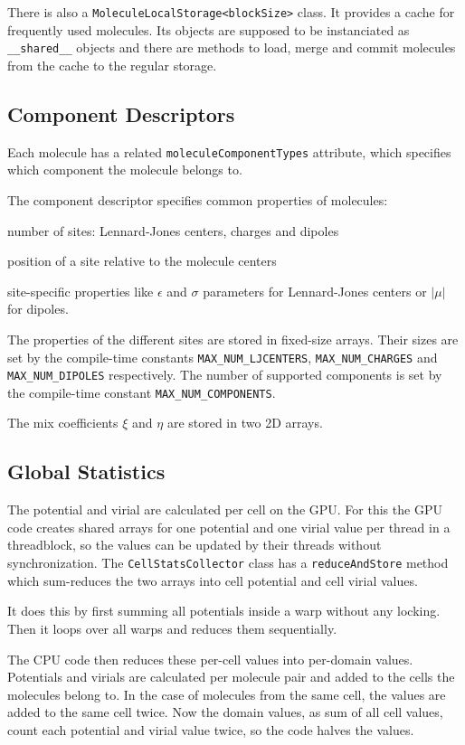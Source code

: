 There is also a \lstinline!MoleculeLocalStorage<blockSize>! class. It provides a cache for frequently used molecules. Its objects are supposed to be instanciated as \lstinline!__shared__! objects and there are methods to load, merge and commit molecules from the cache to the regular storage.

\subsection{Component Descriptors}
Each molecule has a related \lstinline!moleculeComponentTypes! attribute, which specifies which component the molecule belongs to.

The component descriptor specifies common properties of molecules:
\begin{compactitem}
\item number of sites: Lennard-Jones centers, charges and dipoles
\item position of a site relative to the molecule centers
\item site-specific properties like $\epsilon$ and $\sigma$ parameters for Lennard-Jones centers or $\left  | \mu \right | $ for dipoles.
\end{compactitem}
The properties of the different sites are stored in fixed-size arrays.
Their sizes are set by the compile-time constants \lstinline!MAX_NUM_LJCENTERS!, \lstinline!MAX_NUM_CHARGES! and \lstinline!MAX_NUM_DIPOLES! respectively.
The number of supported components is set by the compile-time constant \lstinline!MAX_NUM_COMPONENTS!.

The mix coefficients $\xi$ and $\eta$ are stored in two 2D arrays.

\subsection{Global Statistics}
The potential and virial are calculated per cell on the GPU. For this the GPU code creates shared arrays for one potential and one virial value per thread in a threadblock, so the values can be updated by their threads without synchronization. The \lstinline!CellStatsCollector! class has a \lstinline!reduceAndStore! method which sum-reduces the two arrays into cell potential and cell virial values.

It does this by first summing all potentials inside a warp without any locking. Then it loops over all warps and reduces them sequentially.

The CPU code then reduces these per-cell values into per-domain values. Potentials and virials are calculated per molecule pair and added to the cells the molecules belong to. In the case of molecules from the same cell, the values are added to the same cell twice. Now the domain values, as sum of all cell values, count each potential and virial value twice, so the code halves the values.

